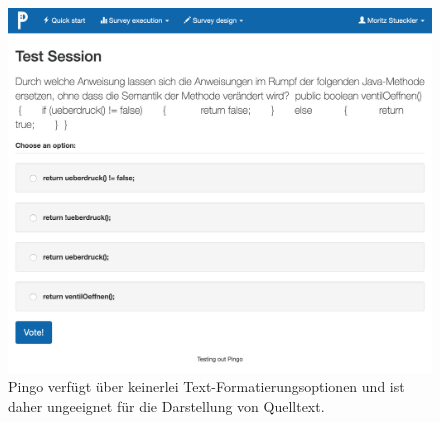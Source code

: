 \begin{figure}[H]
    \includegraphics[width=12cm]{chapter/bewertung/bilder/pingo_problem1.png}
    \centering
    \caption{Pingo verfügt über keinerlei Text-Formatierungsoptionen und ist daher ungeeignet für die Darstellung von Quelltext.}
    \label{abb:pingo_frage}
\end{figure}